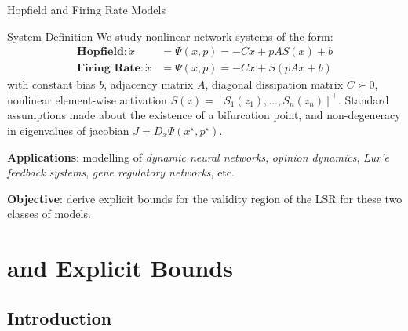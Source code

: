 \documentclass[11pt]{beamer}
\begin{document}
\begin{frame}{Hopfield and Firing Rate Models}
    \setlength{\abovedisplayskip}{3pt}
    \setlength{\belowdisplayskip}{3pt}
    \setlength{\jot}{1pt}

    \begin{block}{System Definition}
        We study nonlinear network systems of the form:
        \begin{subequations}
            \begin{align}
                \textbf{Hopfield}:    \dot{x} & = \Psi(x,p) = -Cx + pAS(x) + b \\
                \textbf{Firing Rate}: \dot{x} & = \Psi(x,p) = -Cx + S(pAx + b)
            \end{align} \label{NDS}
        \end{subequations}
        with constant \alert{bias} \(b\), \alert{adjacency} matrix \(A\), diagonal \alert{dissipation} matrix \(C \succ 0\), nonlinear element-wise \alert{activation} \(S(z) = [S_1(z_1), \dots, S_n(z_n)]^{\top}\).
        Standard assumptions made about the existence of a bifurcation point, and non-degeneracy in eigenvalues of jacobian \(J=D_{x}\Psi(x^{\star},p^{\star})\).
    \end{block}

    \vspace{4mm} \pause

    \textbf{Applications}: modelling of \emph{dynamic neural networks}, \emph{opinion dynamics}, \emph{Lur'e feedback systems}, \emph{gene regulatory networks}, etc.

    \vspace{4mm} \pause

    \textbf{Objective}: derive \alert{explicit bounds} for the validity region of the LSR for these two classes of models.
\end{frame}

\section{\LSR{} and Explicit Bounds}

\subsection{Introduction}
\end{document}
